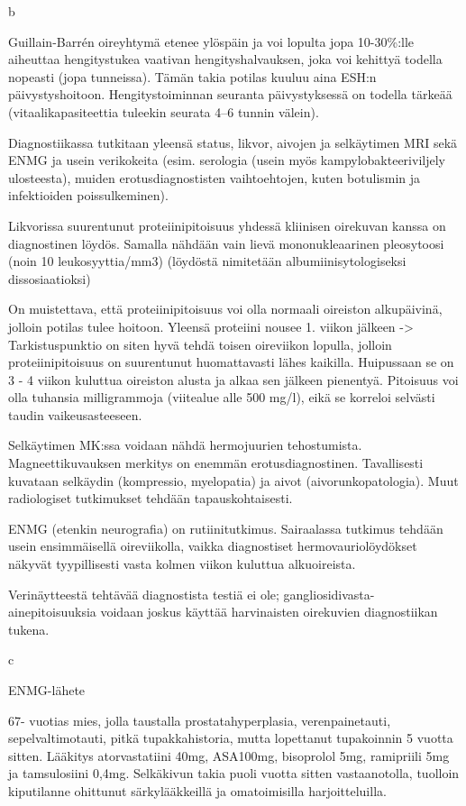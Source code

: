 \documentclass[
]{book}
\begin{document}
b

Guillain-Barrén oireyhtymä etenee ylöspäin ja voi lopulta jopa 10-30\%:lle aiheuttaa hengitystukea vaativan hengityshalvauksen, joka voi kehittyä todella nopeasti (jopa tunneissa). Tämän takia potilas kuuluu aina ESH:n päivystyshoitoon. Hengitystoiminnan seuranta päivystyksessä on todella tärkeää (vitaalikapasiteettia tuleekin seurata 4--6 tunnin välein).

Diagnostiikassa tutkitaan yleensä status, likvor, aivojen ja selkäytimen MRI sekä ENMG ja usein verikokeita (esim. serologia (usein myös kampylobakteeriviljely ulosteesta), muiden erotusdiagnostisten vaihtoehtojen, kuten botulismin ja infektioiden poissulkeminen).

Likvorissa suurentunut proteiinipitoisuus yhdessä kliinisen oirekuvan kanssa on diagnostinen löydös. Samalla nähdään vain lievä mononukleaarinen pleosytoosi (noin 10 leukosyyttia/mm3) (löydöstä nimitetään albumiinisytologiseksi dissosiaatioksi)

On muistettava, että proteiinipitoisuus voi olla normaali oireiston alkupäivinä, jolloin potilas tulee hoitoon. Yleensä proteiini nousee 1. viikon jälkeen -\textgreater{} Tarkistuspunktio on siten hyvä tehdä toisen oireviikon lopulla, jolloin proteiinipitoisuus on suurentunut huomattavasti lähes kaikilla. Huipussaan se on 3 - 4 viikon kuluttua oireiston alusta ja alkaa sen jälkeen pienentyä. Pitoisuus voi olla tuhansia milligrammoja (viitealue alle 500 mg/l), eikä se korreloi selvästi taudin vaikeusasteeseen.

Selkäytimen MK:ssa voidaan nähdä hermojuurien tehostumista. Magneettikuvauksen merkitys on enemmän erotusdiagnostinen. Tavallisesti kuvataan selkäydin (kompressio, myelopatia) ja aivot (aivorunkopatologia). Muut radiologiset tutkimukset tehdään tapauskohtaisesti.

ENMG (etenkin neurografia) on rutiinitutkimus. Sairaalassa tutkimus tehdään usein ensimmäisellä oireviikolla, vaikka diagnostiset hermovauriolöydökset näkyvät tyypillisesti vasta kolmen viikon kuluttua alkuoireista.

Verinäytteestä tehtävää diagnostista testiä ei ole; gangliosidivasta-ainepitoisuuksia voidaan joskus käyttää harvinaisten oirekuvien diagnostiikan tukena.

c

ENMG-lähete

67- vuotias mies, jolla taustalla prostatahyperplasia, verenpainetauti, sepelvaltimotauti, pitkä tupakkahistoria, mutta lopettanut tupakoinnin 5 vuotta sitten. Lääkitys atorvastatiini 40mg, ASA100mg, bisoprolol 5mg, ramipriili 5mg ja tamsulosiini 0,4mg. Selkäkivun takia puoli vuotta sitten vastaanotolla, tuolloin kiputilanne ohittunut särkylääkkeillä ja omatoimisilla harjoitteluilla.
\end{document}
